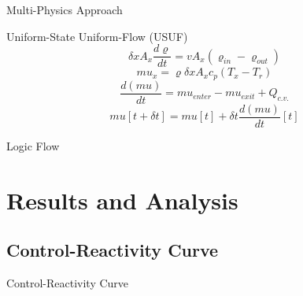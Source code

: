 \documentclass[aspectratio=169,pdftex,dvipsnames]{beamer}
\begin{document}
\begin{frame}{Multi-Physics Approach}
\begin{block}{Uniform-State Uniform-Flow (USUF)}
{            \begin{equation*}
                \delta x A_x \frac{d\varrho}{dt} = v A_x(\varrho_{in}-\varrho_{out})
            \end{equation*}
            \begin{equation*}\label{eq:T2mu}
                mu_x = \varrho\delta x A_x c_p(T_x-T_r) 
            \end{equation*}
            \begin{equation*}
                \frac{d(mu)}{dt} = mu_{enter} - mu_{exit} + Q_{c.v.}
            \end{equation*}
            \begin{equation*}
                mu[t+\delta t] = mu[t] + \delta t\frac{d(mu)}{dt}[t]
            \end{equation*}
        }
    \end{block}
\end{frame}

\begin{frame}{Logic Flow}
    \begin{figure}[!ht]
        \centering
        \resizebox{!}{\textheight}{}
    \end{figure}
\end{frame}

\section{Results and Analysis}
\subsection{Control-Reactivity Curve}
\begin{frame}{Control-Reactivity Curve}
    \begin{figure}[!ht]
        \centering
    \end{figure}
\end{frame}
\end{document}
